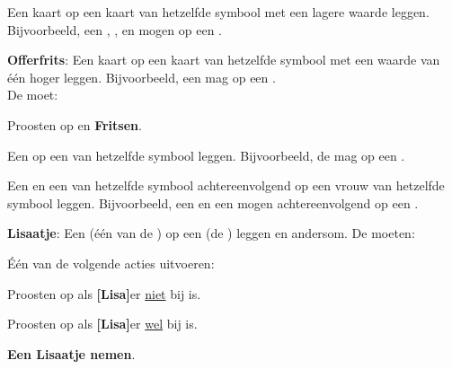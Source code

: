 \newpage
{}



    \item Een kaart op een kaart van hetzelfde symbool met een lagere waarde leggen. Bijvoorbeeld, een , ,  en  mogen op een .
\eindLijst{}

\vervolgLijst{}
    \item \textbf{Offerfrits}: Een kaart op een kaart van hetzelfde symbool met een waarde van \'e\'en hoger leggen. Bijvoorbeeld, een  mag op een . \\De \huidigeSpeler moet:
    \puntLijst{}
        \item Proosten op  en \textbf{Fritsen}.
    \eindPuntLijst{}
    \label{zet:offer_frits}
\eindLijst{}

\vervolgLijst{}
    \item Een  op een  van hetzelfde symbool leggen. Bijvoorbeeld, de  mag op een .
\eindLijst{}


\vervolgLijst{}
    \item \label{zet:dubbel} Een  en een  van hetzelfde symbool achtereenvolgend op een vrouw van hetzelfde symbool leggen. Bijvoorbeeld, een  en een  mogen achtereenvolgend op een .
\eindLijst{}

\vervolgLijst{}
    \item \label{zet:lisa} \textbf{Lisaatje}: Een  (\'e\'en van de ) op een  (de ) leggen en andersom. De \andereSpelers moeten:
     \puntLijst{}
        \item Één van de volgende acties uitvoeren:
        \numeriekeLijst{}
            \item Proosten op  als \textbf{[Lisa]}\footnotemark[1] er \ul{niet} bij is.
            \item Proosten op  als \textbf{[Lisa]}\footnotemark[1] er \ul{wel} bij is.
        \eindNumeriekeLijst{}
        \item \textbf{Een Lisaatje nemen}\footnotemark[2].
    \eindPuntLijst{}
\eindLijst{}

